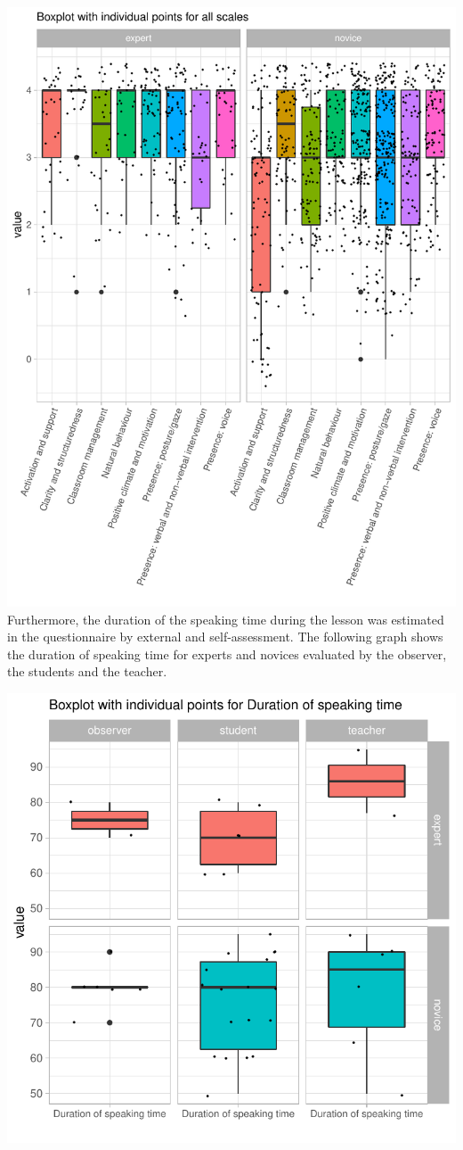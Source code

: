\documentclass[
  english,
  man,floatsintext]{apa6}
\begin{document}
\includegraphics{paper_1_supplement_files/figure-latex/boxplot scales-1.pdf}
\newpage
Furthermore, the duration of the speaking time during the lesson was estimated in the questionnaire by external and self-assessment. The following graph shows the duration of speaking time for experts and novices evaluated by the observer, the students and the teacher.

\includegraphics{paper_1_supplement_files/figure-latex/Duration speaking time-1.pdf}
\newpage
\end{document}
